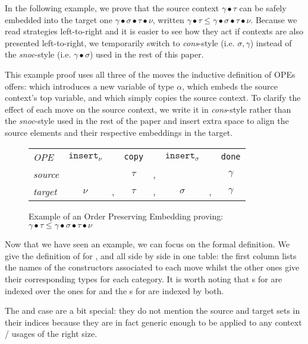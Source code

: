 \documentclass[a4paper,UKenglish]{lipics-v2016}
\begin{document}
In the following example, we prove that the source context $\gamma ∙ \tau$
can be safely embedded into the target one $\gamma ∙ \sigma ∙ \tau ∙ \nu$,
written $\gamma ∙ \tau \leq \gamma ∙ \sigma ∙ \tau ∙ \nu$. Because we read
strategies left-to-right and it is easier to see how they act if contexts
are also presented left-to-right, we temporarily switch to \emph{cons}-style
(i.e. $\sigma , \gamma$) instead of the \emph{snoc}-style (i.e. $\gamma ∙ \sigma$)
used in the rest of this paper.

This example proof uses all three of the moves the inductive definition of
OPEs offers: \opeinsert{\alpha} which introduces a new variable of type
$\alpha$, \opecopy{} which embeds the source context's top variable,
and \opedone{} which simply copies the source context. To clarify the
effect of each move on the source context, we write it in \textit{cons}-style
rather than the \textit{snoc}-style used in the rest of the paper and insert
extra space to align the source elements and their respective embeddings in
the target.

\begin{figure}[ht]\centering
\begin{tabular}{l|ccccccc}
\textit{OPE} & $\texttt{insert}_{\nu}$ &
             & \texttt{copy} &
             & $\texttt{insert}_{\sigma}$ &
             & \texttt{done}\\
\textit{source} & &
                & $\tau$ & ,
                & &
                & $\gamma$ \\
\textit{target} & $\nu$ & ,
                & $\tau$ & ,
                & $\sigma$ & ,
                & $\gamma$ \\
\end{tabular}
\caption{Example of an Order Preserving Embedding proving:
         $\gamma ∙ \tau
          \leq
          \gamma ∙ \sigma ∙ \tau ∙ \nu$\label{figure:exampleOpe}}
\end{figure}

Now that we have seen an example, we can focus on the formal definition.
We give the definition of \OPE{} for \Nat{}, \Context{} and \Usages{} all
side by side in one table: the first column lists the names of the
constructors associated to each move whilst the other ones give their
corresponding types for each category. It is worth noting that \OPE{}s for
\Context{} are indexed over the ones for \Nat{} and the \OPE{}s for \Usages{}
are indexed by both.

The \Context{} and \Usages{} case are a bit special: they do not mention
the source and target sets in their indices because they are in fact
generic enough to be applied to any context / usages of the right size.
\end{document}
